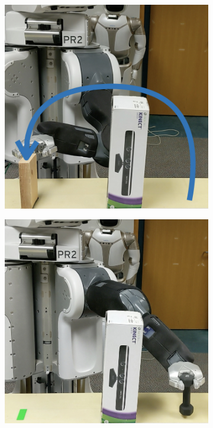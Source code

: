 \begin{figure}[t]
\begin{subfigure}{0.13\linewidth}
  \end{subfigure}
  \begin{subfigure}{0.13\linewidth}
    \includegraphics[width=\linewidth]{figures/cmax/pr2_pick_place_light_3_annotated.jpeg}
  \end{subfigure}
  \begin{subfigure}{0.13\linewidth}
    \includegraphics[width=\linewidth]{figures/cmax/pr2_pick_place_heavy_1_annotated.jpeg}

\end{subfigure}
\end{figure}
